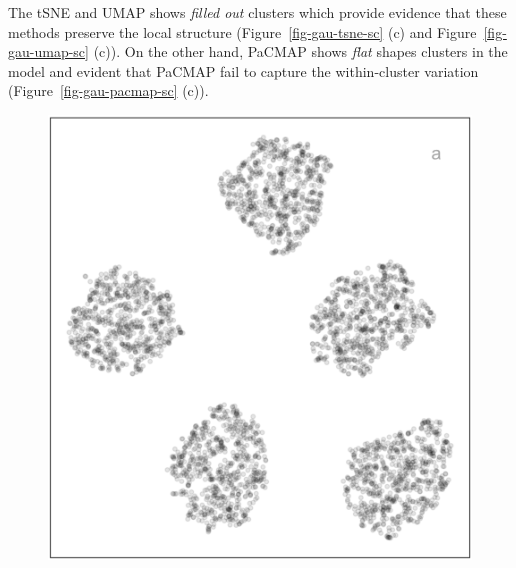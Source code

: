 \documentclass[
  12pt]{article}
\begin{document}
The tSNE and UMAP shows \emph{filled out} clusters which provide
evidence that these methods preserve the local structure
(Figure~\ref{fig-gau-tsne-sc} (c) and Figure~\ref{fig-gau-umap-sc} (c)).
On the other hand, PaCMAP shows \emph{flat} shapes clusters in the model
and evident that PaCMAP fail to capture the within-cluster variation
(Figure~\ref{fig-gau-pacmap-sc} (c)).

\begin{figure}[H]

\begin{minipage}{0.33\linewidth}
\includegraphics{figures/five_gau_clusters/tsne_layout.png}\end{minipage}%
%
\begin{minipage}{0.33\linewidth}

\end{minipage}
\end{figure}
\end{document}
